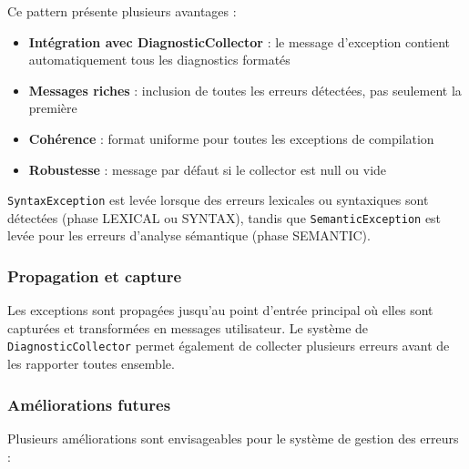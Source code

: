 Ce pattern présente plusieurs avantages :
\begin{itemize}
    \item \textbf{Intégration avec DiagnosticCollector} : le message d'exception contient automatiquement tous les diagnostics formatés
    \item \textbf{Messages riches} : inclusion de toutes les erreurs détectées, pas seulement la première
    \item \textbf{Cohérence} : format uniforme pour toutes les exceptions de compilation
    \item \textbf{Robustesse} : message par défaut si le collector est null ou vide
\end{itemize}

\texttt{SyntaxException} est levée lorsque des erreurs lexicales ou syntaxiques sont détectées (phase LEXICAL ou SYNTAX), tandis que \texttt{SemanticException} est levée pour les erreurs d'analyse sémantique (phase SEMANTIC).

\subsubsection{Propagation et capture}

Les exceptions sont propagées jusqu'au point d'entrée principal où elles sont capturées et transformées en messages utilisateur. Le système de \texttt{DiagnosticCollector} permet également de collecter plusieurs erreurs avant de les rapporter toutes ensemble.


\subsubsection{Améliorations futures}\label{subsec:ameliorations-futures}

Plusieurs améliorations sont envisageables pour le système de gestion des erreurs :


